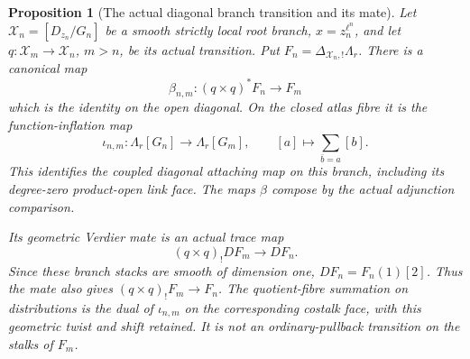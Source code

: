 \documentclass[11pt]{article}
\newtheorem{proposition}{Proposition}[section]
\theoremstyle{definition}
\theoremstyle{remark}
\begin{document}
\begin{proposition}[The actual diagonal branch transition and its mate]
\label{prop:root-diagonal-branch-transition}
Let $\mathcal X_n=[D_{z_n}/G_n]$ be a smooth strictly local root
branch, $x=z_n^{\ell^n}$, and let
$q:\mathcal X_m\to\mathcal X_n$, $m>n$, be its actual transition.
Put $F_n=\Delta_{\mathcal X_n,!}\Lambda_r$.  There is a canonical
map
\begin{equation}
 \beta_{n,m}:(q\times q)^*F_n\longrightarrow F_m
 \label{eq:root-diagonal-branch-beta}
\end{equation}
which is the identity on the open diagonal.  On the closed
atlas fibre it is the function-inflation map
\[
 \iota_{n,m}:\Lambda_r[G_n]\longrightarrow\Lambda_r[G_m],
 \qquad [a]\longmapsto\sum_{\bar b=a}[b].
\]
This identifies the coupled diagonal attaching map on this branch,
including its degree-zero product-open link face.  The maps
$\beta$ compose by the actual adjunction comparison.

Its geometric Verdier mate is an actual trace map
\begin{equation}
 (q\times q)_!D F_m\longrightarrow D F_n.
 \label{eq:root-diagonal-branch-trace}
\end{equation}
Since these branch stacks are smooth of dimension one,
$D F_n=F_n(1)[2]$.  Thus the mate also gives
$(q\times q)_!F_m\to F_n$.  The quotient-fibre summation on
distributions is the dual of $\iota_{n,m}$ on the corresponding
\emph{costalk} face, with this geometric twist and shift retained.
It is not an ordinary-pullback transition on the stalks of $F_m$.
\end{proposition}
\end{document}
